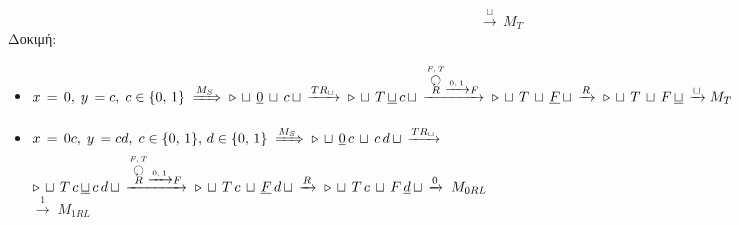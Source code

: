 \reducevspace\reducevspace\reducevspace\reducevspace\reducevspace\reducevspace\reducevspace\reducevspace\reducevspace
\reducevspace\reducevspace\reducevspace\reducevspace\reducevspace\reducevspace\reducevspace\reducevspace\reducevspace
\reducevspace\reducevspace\reducevspace\reducevspace\reducevspace\reducevspace\reducevspace\reducevspace\reducevspace
\reducevspace\reducevspace\reducevspace\reducevspace\reducevspace\reducevspace\reducevspace\reducevspace\reducevspace
\[\qquad\qquad\qquad\qquad\quad\xrightarrow{\sqcup}\, M_T\]
\reducevspace\reducevspace\reducevspace\reducevspace\reducevspace\reducevspace\reducevspace\reducevspace\reducevspace
Δοκιμή:
\reducevspace\reducevspace\reducevspace\reducevspace\reducevspace\reducevspace\reducevspace\reducevspace\reducevspace
\begin{itemize}
	\itemsep0em
	\item $x\,=\,0,\; y\,=c,\; c\in\{0,\,1\} \;\xRightarrow{M_S}\;
	\triangleright\, \sqcup\, \underline{0}\, \sqcup\, c\, \sqcup\,\xrightarrow{TR_\sqcup}\;
	\triangleright\, \sqcup\, T\, \underline{\sqcup}\, c\, \sqcup\,
	\xrightarrow{\overset{F,\,T}{\overset{\botcircleleft}{R}}\xrightarrow{0,\,1}F}\;
	\triangleright\, \sqcup\, T\, \sqcup\, \underline{F}\, \sqcup\, \xrightarrow{R}\;
	\triangleright\, \sqcup\, T\, \sqcup\, F\, \underline{\sqcup}\, \xrightarrow{\sqcup} M_T
	\quad$ \textcolor{green}{}

	\item $x\,=\,0c,\; y\,=cd,\; c\in\{0,\,1\},\,d\in\{0,\,1\} \;\xRightarrow{M_S}\;
	\triangleright\, \sqcup\, \underline{0}\, c\, \sqcup\, c\, d\, \sqcup\,\xrightarrow{TR_\sqcup}\;$\\$
	\triangleright\, \sqcup\, T\, c\, \underline{\sqcup}\, c\, d\, \sqcup\,
	\xrightarrow{\overset{F,\,T}{\overset{\botcircleleft}{R}}\xrightarrow{0,\,1}F}\;
	\triangleright\, \sqcup\, T\, c\, \sqcup\, \underline{F}\, d\, \sqcup\, \xrightarrow{R}\;
	\triangleright\, \sqcup\, T\, c\, \sqcup\, F\, \underline{d}\, \sqcup\, \xrightarrow{0}\; M_{0RL}
	\quad$\textcolor{green}{}\\
	\makebox[11.32cm]{\hfill} $\xrightarrow{1}\; M_{1RL}\quad$\textcolor{green}{}
\end{itemize}


